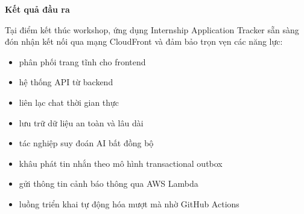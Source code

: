 \vspace{0.5em}\noindent\textbf{Kết quả đầu ra}\par

Tại điểm kết thúc workshop, ứng dụng Internship Application Tracker sẵn
sàng đón nhận kết nối qua mạng CloudFront và đảm bảo trọn vẹn các năng
lực:

\begin{itemize}
\tightlist
\item
  phân phối trang tĩnh cho frontend
\item
  hệ thống API từ backend
\item
  liên lạc chat thời gian thực
\item
  lưu trữ dữ liệu an toàn và lâu dài
\item
  tác nghiệp suy đoán AI bất đồng bộ
\item
  khâu phát tin nhắn theo mô hình transactional outbox
\item
  gửi thông tin cảnh báo thông qua AWS Lambda
\item
  luồng triển khai tự động hóa mượt mà nhờ GitHub Actions
\end{itemize}
